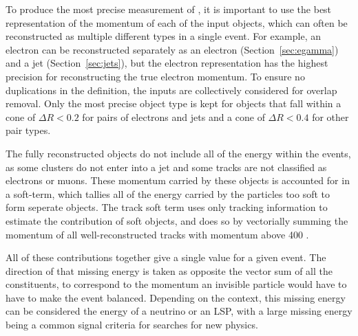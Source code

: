 To produce the most precise measurement of \met, it is important to use the best representation of the momentum of each of the input objects, which can often be reconstructed as multiple different types in a single event.
For example, an electron can be reconstructed separately as an electron (Section~\ref{sec:egamma}) and a jet (Section~\ref{sec:jets}), but the electron representation has the highest precision for reconstructing the true electron momentum.
To ensure no duplications in the \met definition, the inputs are collectively considered for overlap removal.
Only the most precise object type is kept for objects that fall within a cone of $\Delta R < 0.2$ for pairs of electrons and jets and a cone of $\Delta R < 0.4$ for other pair types.

The fully reconstructed objects do not include all of the energy within the events, as some clusters do not enter into a jet and some tracks are not classified as electrons or muons.
These momentum carried by these objects is accounted for in a soft-term, which tallies all of the energy carried by the particles too soft to form seperate objects.
The track soft term uses only tracking information to estimate the contribution of soft objects, and does so by vectorially summing the momentum of all well-reconstructed tracks with momentum above 400 \MeV.

All of these contributions together give a single \met value for a given event.
The direction of that missing energy is taken as opposite the vector sum of all the constituents, to correspond to the momentum an invisible particle would have to have to make the event balanced.
Depending on the context, this missing energy can be considered the energy of a neutrino or an \ac{LSP}, with a large missing energy being a common signal criteria for searches for new physics.

